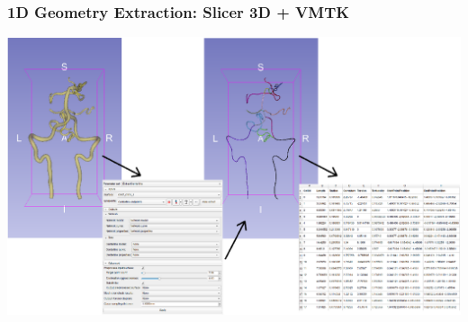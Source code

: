 \documentclass{beamer}
\begin{document}
\begin{frame}
\begin{figure}[htbp]
\begin{minipage}[c][0.33\paperheight][c]{\linewidth}
{\begin{minipage}{0.18\linewidth}
		\end{minipage}}
			\hfill
		\end{minipage}
	\end{figure}
\end{frame}


\begin{frame}
	\frametitle{1D Geometry Extraction: Slicer 3D + VMTK}
	\begin{center}
		\includegraphics[width=\textwidth]{images/0053_extract.eps}
	\end{center}
\end{frame}
\end{document}
